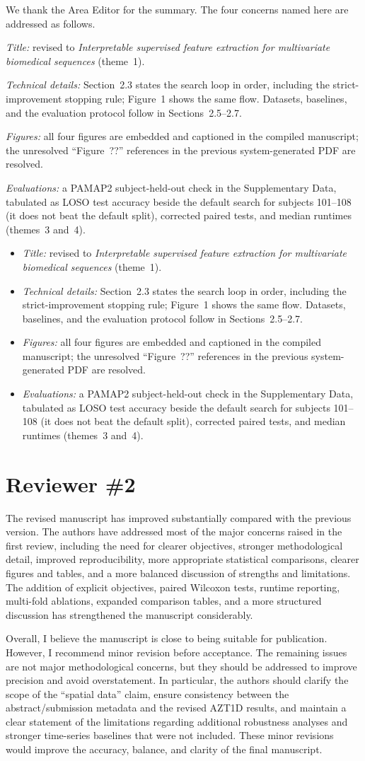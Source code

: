 \documentclass[11pt]{article}
\makeatletter
\newcommand{\rsp}{\par\vspace{0.9em}}
\newcommand{\rc}[1]{\begin{reviewerbox}#1\end{reviewerbox}}
\newcommand{\response}[2]{%
  \begin{responsebox}#1%
  \def\@responseitems{#2}%
  \ifx\@responseitems\empty\else\begin{itemize}[nosep,leftmargin=1.2em]#2\end{itemize}\fi
  \end{responsebox}\rsp}
\makeatother
\begin{document}
\response{We thank the Area Editor for the summary. The four concerns named here are addressed as
follows.}{
  \item \emph{Title:} revised to \emph{Interpretable supervised feature extraction for multivariate
    biomedical sequences} (theme~1).
  \item \emph{Technical details:} Section~2.3 states the search loop in order, including the
    strict-improvement stopping rule; Figure~1 shows the same
    flow. Datasets, baselines, and the evaluation protocol follow in Sections~2.5--2.7.
  \item \emph{Figures:} all four figures are embedded and captioned in the compiled manuscript; the
    unresolved ``Figure~??'' references in the previous system-generated PDF are resolved.
  \item \emph{Evaluations:} a PAMAP2 subject-held-out check in the Supplementary Data, tabulated
    as LOSO test accuracy beside the default search for subjects 101--108 (it does not
    beat the default split), corrected paired tests, and median runtimes (themes~3 and~4).
}

\section*{Reviewer \#2}

\rc{The revised manuscript has improved substantially compared with the previous version. The authors
have addressed most of the major concerns raised in the first review, including the need for clearer
objectives, stronger methodological detail, improved reproducibility, more appropriate statistical
comparisons, clearer figures and tables, and a more balanced discussion of strengths and limitations.
The addition of explicit objectives, paired Wilcoxon tests, runtime reporting, multi-fold ablations,
expanded comparison tables, and a more structured discussion has strengthened the manuscript
considerably.

Overall, I believe the manuscript is close to being suitable for publication. However, I recommend
minor revision before acceptance. The remaining issues are not major methodological concerns, but
they should be addressed to improve precision and avoid overstatement. In particular, the authors
should clarify the scope of the ``spatial data'' claim, ensure consistency between the
abstract/submission metadata and the revised AZT1D results, and maintain a clear statement of the
limitations regarding additional robustness analyses and stronger time-series baselines that were not
included. These minor revisions would improve the accuracy, balance, and clarity of the final
manuscript.}
\end{document}
